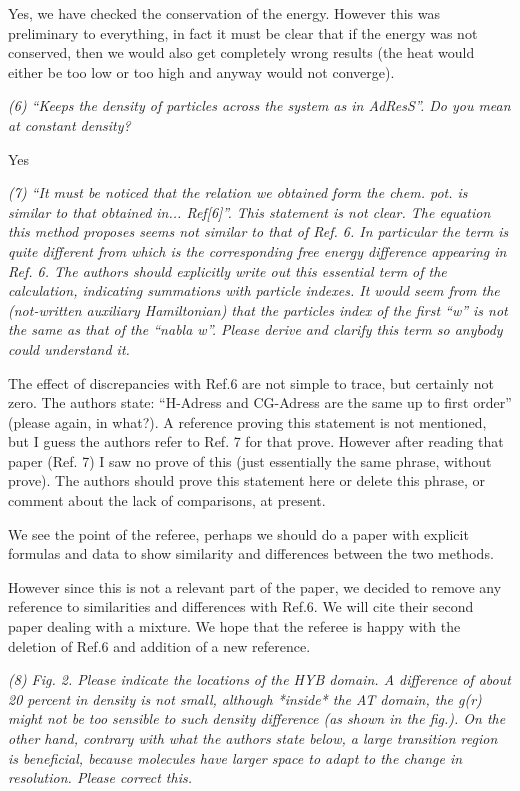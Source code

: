\documentclass[12pt]{article}
\begin{document}
  Yes, we have checked the conservation of the energy. However this
  was preliminary to everything, in fact it must be clear that if the
  energy was not conserved, then we would also get completely wrong
  results (the heat would either be too low or too high and anyway
  would not converge).


  {\it (6) ``Keeps the density of particles across the system as in
    AdResS''. Do you mean at constant density?}

Yes


{\it (7) ``It must be noticed that the relation we obtained form the
  chem. pot. is similar to that obtained in... Ref[6]''. This
  statement is not clear. The equation this method proposes seems not
  similar to that of Ref. 6. In particular the term is quite different
  from which is the corresponding free energy difference appearing in
  Ref. 6. The authors should explicitly write out this essential term
  of the calculation, indicating summations with particle indexes. It
  would seem from the (not-written auxiliary Hamiltonian) that the
  particles index of the first ``w'' is not the same as that of the
  ``nabla w''. Please derive and clarify this term so anybody could
  understand it.

  The effect of discrepancies with Ref.6 are not simple to trace, but
  certainly not zero. The authors state: ``H-Adress and CG-Adress are
  the same up to first order'' (please again, in what?). A reference
  proving this statement is not mentioned, but I guess the authors
  refer to Ref. 7 for that prove. However after reading that paper
  (Ref. 7) I saw no prove of this (just essentially the same phrase,
  without prove). The authors should prove this statement here or
  delete this phrase, or comment about the lack of comparisons, at
  present.}

We see the point of the referee, perhaps we should do a paper with
explicit formulas and data to show similarity and differences between
the two methods.

However since this is not a relevant part of the paper, we decided to
remove any reference to similarities and differences with Ref.6.  We
will cite their second paper dealing with a mixture. We hope that the
referee is happy with the deletion of Ref.6 and addition of a new
reference.


{\it (8) Fig. 2. Please indicate the locations of the HYB domain. A
  difference of about 20 percent in density is not small, although
  *inside* the AT domain, the g(r) might not be too sensible to such
  density difference (as shown in the fig.). On the other hand,
  contrary with what the authors state below, a large transition
  region is beneficial, because molecules have larger space to adapt
  to the change in resolution. Please correct this.}
\end{document}
